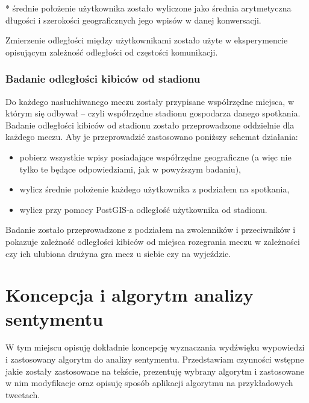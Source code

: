* średnie położenie użytkownika zostało wyliczone jako średnia arytmetyczna
długości i szerokości geograficznych jego wpisów w danej konwersacji.

Zmierzenie odległości między użytkownikami zostało użyte w eksperymencie
opisującym zależność odległości od częstości komunikacji.



\subsubsection{Badanie odległości kibiców od stadionu}
\label{subsubsection:badanieodleglosciodstadionu}
Do każdego nasłuchiwanego meczu zostały przypisane współrzędne miejsca, w którym
się odbywał -- czyli współrzędne stadionu gospodarza danego spotkania. Badanie
odległości kibiców od stadionu zostało przeprowadzone oddzielnie dla każdego meczu. Aby je
przeprowadzić zastosowano poniższy schemat działania:

\begin{itemize}
  \item pobierz wszystkie wpisy posiadające współrzędne geograficzne (a więc
  nie tylko te będące odpowiedziami, jak w powyższym badaniu),
  \item wylicz średnie położenie każdego użytkownika z podziałem na spotkania,
  \item wylicz przy pomocy PostGIS-a odległość użytkownika od stadionu.
\end{itemize}

Badanie zostało przeprowadzone z podziałem na zwolenników i przeciwników i
pokazuje zależność odległości kibiców od miejsca rozegrania meczu w zależności
czy ich ulubiona drużyna gra mecz u siebie czy na wyjeździe.










\section{Koncepcja i algorytm analizy sentymentu}
\label{section:koncepcjaialgorytmanalizysentymentu}

W tym miejscu opisuję dokładnie koncepcję wyznaczania wydźwięku wypowiedzi i
zastosowany algorytm do analizy sentymentu. Przedstawiam czynności wstępne jakie
zostały zastosowane na tekście, prezentuję wybrany algorytm i zastosowane
w nim modyfikacje oraz opisuję sposób aplikacji algorytmu na przykładowych
tweetach.

